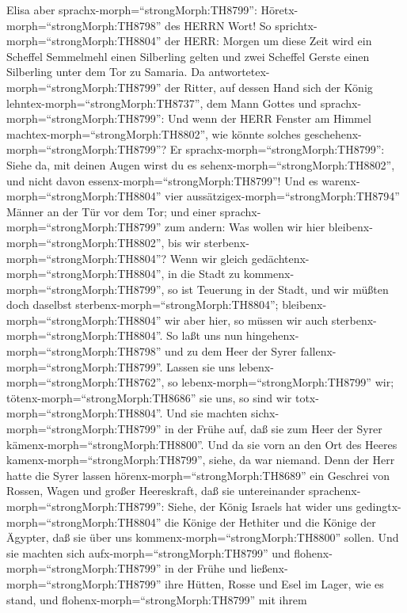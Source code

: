  Elisa aber sprachx-morph=``strongMorph:TH8799'':
Höretx-morph=``strongMorph:TH8798'' des HERRN Wort! So
sprichtx-morph=``strongMorph:TH8804'' der HERR: Morgen um diese Zeit
wird ein Scheffel Semmelmehl einen Silberling gelten und zwei Scheffel
Gerste einen Silberling unter dem Tor zu Samaria.  Da
antwortetex-morph=``strongMorph:TH8799'' der Ritter, auf dessen Hand
sich der König lehntex-morph=``strongMorph:TH8737'', dem Mann Gottes und
sprachx-morph=``strongMorph:TH8799'': Und wenn der HERR Fenster am
Himmel machtex-morph=``strongMorph:TH8802'', wie könnte solches
geschehenx-morph=``strongMorph:TH8799''? Er
sprachx-morph=``strongMorph:TH8799'': Siehe da, mit deinen Augen wirst
du es sehenx-morph=``strongMorph:TH8802'', und nicht davon
essenx-morph=``strongMorph:TH8799''!  Und es
warenx-morph=``strongMorph:TH8804'' vier
aussätzigex-morph=``strongMorph:TH8794'' Männer an der Tür vor dem Tor;
und einer sprachx-morph=``strongMorph:TH8799'' zum andern: Was wollen
wir hier bleibenx-morph=``strongMorph:TH8802'', bis wir
sterbenx-morph=``strongMorph:TH8804''?  Wenn wir gleich
gedächtenx-morph=``strongMorph:TH8804'', in die Stadt zu
kommenx-morph=``strongMorph:TH8799'', so ist Teuerung in der Stadt, und
wir müßten doch daselbst sterbenx-morph=``strongMorph:TH8804'';
bleibenx-morph=``strongMorph:TH8804'' wir aber hier, so müssen wir auch
sterbenx-morph=``strongMorph:TH8804''. So laßt uns nun
hingehenx-morph=``strongMorph:TH8798'' und zu dem Heer der Syrer
fallenx-morph=``strongMorph:TH8799''. Lassen sie uns
lebenx-morph=``strongMorph:TH8762'', so
lebenx-morph=``strongMorph:TH8799'' wir;
tötenx-morph=``strongMorph:TH8686'' sie uns, so sind wir
totx-morph=``strongMorph:TH8804''.  Und sie machten
sichx-morph=``strongMorph:TH8799'' in der Frühe auf, daß sie zum Heer
der Syrer kämenx-morph=``strongMorph:TH8800''. Und da sie vorn an den
Ort des Heeres kamenx-morph=``strongMorph:TH8799'', siehe, da war
niemand.  Denn der Herr hatte die Syrer lassen
hörenx-morph=``strongMorph:TH8689'' ein Geschrei von Rossen, Wagen und
großer Heereskraft, daß sie untereinander
sprachenx-morph=``strongMorph:TH8799'': Siehe, der König Israels hat
wider uns gedingtx-morph=``strongMorph:TH8804'' die Könige der Hethiter
und die Könige der Ägypter, daß sie über uns
kommenx-morph=``strongMorph:TH8800'' sollen.  Und sie
machten sich aufx-morph=``strongMorph:TH8799'' und
flohenx-morph=``strongMorph:TH8799'' in der Frühe und
ließenx-morph=``strongMorph:TH8799'' ihre Hütten, Rosse und Esel im
Lager, wie es stand, und flohenx-morph=``strongMorph:TH8799'' mit ihrem
